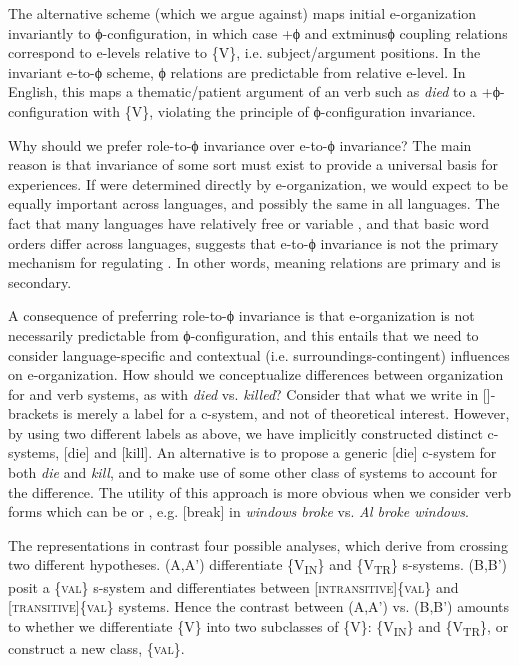   The alternative scheme (which we argue against) maps initial e-organization invariantly to ϕ-configuration, in which case +ϕ and 	extminus{}ϕ coupling relations correspond to e-levels relative to \{V\}, i.e. subject/argument positions. In the invariant e-to-ϕ scheme, ϕ relations are predictable from relative e-level. In English, this maps a thematic/patient argument of an  verb such as \textit{died} to a +ϕ-configuration with \{V\}, violating the principle of ϕ-configuration invariance.

  Why should we prefer role-to-ϕ invariance over e-to-ϕ invariance? The main reason is that invariance of some sort must exist to provide a universal basis for  experiences. If  were determined directly by e-organization, we would expect  to be equally important across languages, and possibly the same in all languages. The fact that many languages have relatively free or variable , and that basic word orders differ across languages, suggests that e-to-ϕ invariance is not the primary mechanism for regulating . In other words, meaning relations are primary and  is secondary.

  A consequence of preferring role-to-ϕ invariance is that e-organization is not necessarily predictable from ϕ-configuration, and this entails that we need to consider language-specific and contextual (i.e. surroundings-contingent) influences on e-organization. How should we conceptualize differences between organization for  and  verb systems, as with \textit{died} vs. \textit{killed}? Consider that what we write in []-brackets is merely a label for a c-system, and not of theoretical interest. However, by using two different labels as above, we have implicitly constructed distinct c-systems, [die] and [kill]. An alternative is to propose a generic [die] c-system for both \textit{die} and \textit{kill}, and to make use of some other class of systems to account for the  difference. The utility of this approach is more obvious when we consider verb forms which can be  or , e.g. [break] in \textit{windows broke} vs. \textit{Al broke windows}. 

  The representations in {} contrast four possible analyses, which derive from crossing two different hypotheses. (A,A') differentiate  \{V\textsubscript{IN}\} and  \{V\textsubscript{TR}\} s-systems. (B,B') posit a  \{\textsc{val}\} s-system and differentiates between [\textsc{intransitive}]\{\textsc{val}\} and [\textsc{transitive}]\{\textsc{val}\} systems. Hence the contrast between (A,A') vs. (B,B') amounts to whether we differentiate \{V\} into two subclasses of \{V\}: \{V\textsubscript{IN}\} and \{V\textsubscript{TR}\}, or construct a new class, \{\textsc{val}\}.

